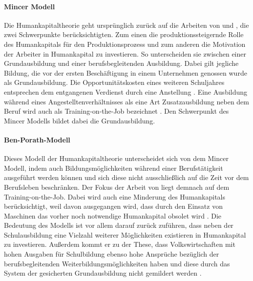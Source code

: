 \paragraph{Mincer Modell}
Die Humankapitaltheorie geht urspr{\"u}nglich zur{\"u}ck auf die Arbeiten von \citet{ Becker.1965} und \citet{Mincer.1974}, die zwei Schwerpunkte berücksichtigten. Zum einen die  produktionssteigernde Rolle des Humankapitals f{\"u}r den Produktionsprozess und zum anderen die Motivation der Arbeiter in Humankapital zu investieren. So unterscheiden sie zwischen einer Grundausbildung und einer berufsbegleitenden Ausbildung. Dabei gilt jegliche Bildung, die vor der ersten Besch{\"a}ftigung in einem Unternehmen genossen wurde als Grundausbildung. Die Opportunit{\"a}tskosten eines weiteren Schuljahres entsprechen dem entgangenen Verdienst durch eine Anstellung \citep{Mincer.1974}. Eine Ausbildung w{\"a}hrend eines Angestelltenverhältnisses als eine Art Zusatzausbildung neben dem Beruf wird auch als Training-on-the-Job bezeichnet \citep{Acemoglu.2009}. Den Schwerpunkt des Mincer Modells bildet dabei die Grundausbildung.


\paragraph{Ben-Porath-Modell}
Dieses Modell der Humankapitaltheorie unterscheidet sich von dem Mincer Modell, indem auch Bildungsm{\"o}glichkeiten w{\"a}hrend einer Berufst{\"a}tigkeit ausgef{\"u}hrt werden k{\"o}nnen und sich diese nicht ausschlie{\ss}lich auf die Zeit vor dem Berufsleben beschr{\"a}nken. Der Fokus der Arbeit von \citet{BenPorath.1967} liegt demnach auf dem Training-on-the-Job. Dabei wird auch eine Minderung des Humankapitals ber{\"u}cksichtigt, weil  davon ausgegangen wird, dass durch den Einsatz von Maschinen das vorher noch notwendige Humankapital obsolet wird \citep{BenPorath.1967,Heckman.1998,Guvenen.2012,Manuelli.2014}. Die Bedeutung des Modells ist vor allem darauf zur{\"u}ck zuf{\"u}hren, dass neben der Schulausbildung eine Vielzahl weiterer M{\"o}glichkeiten existieren in Humankapital zu investieren. Au{\ss}erdem kommt er zu der These, dass Volkswirtschaften mit hohen Ausgaben f{\"u}r Schulbildung ebenso hohe Anspr{\"u}che bez{\"u}glich der berufsbegleitenden Weiterbildungsm{\"o}glichkeiten haben und diese durch das System der gesicherten Grundausbildung nicht gemildert werden \citep{BenPorath.1967}.


